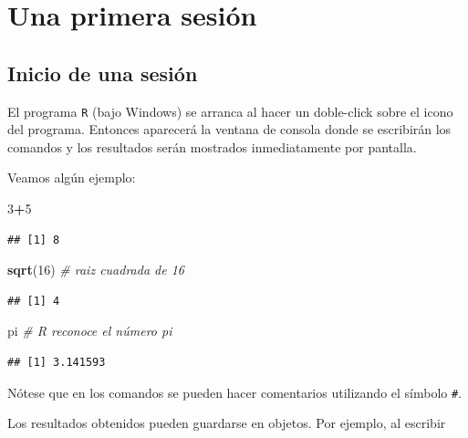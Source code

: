 \documentclass[]{book}
\newenvironment{Shaded}{\begin{snugshade}}{\end{snugshade}}
\newcommand{\KeywordTok}[1]{\textcolor[rgb]{0.13,0.29,0.53}{\textbf{#1}}}
\newcommand{\DecValTok}[1]{\textcolor[rgb]{0.00,0.00,0.81}{#1}}
\newcommand{\CommentTok}[1]{\textcolor[rgb]{0.56,0.35,0.01}{\textit{#1}}}
\newcommand{\OperatorTok}[1]{\textcolor[rgb]{0.81,0.36,0.00}{\textbf{#1}}}
\newcommand{\NormalTok}[1]{#1}
\begin{document}
\section{Una primera sesión}\label{una-primera-sesion}

\subsection{Inicio de una sesión}\label{inicio-de-una-sesion}

El programa \texttt{R} (bajo Windows) se arranca al hacer un doble-click
sobre el icono del programa. Entonces aparecerá la ventana de consola
donde se escribirán los comandos y los resultados serán mostrados
inmediatamente por pantalla.

Veamos algún ejemplo:

\begin{Shaded}
\begin{Highlighting}[]
\DecValTok{3}\OperatorTok{+}\DecValTok{5}
\end{Highlighting}
\end{Shaded}

\begin{verbatim}
## [1] 8
\end{verbatim}

\begin{Shaded}
\begin{Highlighting}[]
\KeywordTok{sqrt}\NormalTok{(}\DecValTok{16}\NormalTok{) }\CommentTok{# raiz cuadrada de 16}
\end{Highlighting}
\end{Shaded}

\begin{verbatim}
## [1] 4
\end{verbatim}

\begin{Shaded}
\begin{Highlighting}[]
\NormalTok{pi }\CommentTok{# R reconoce el número pi}
\end{Highlighting}
\end{Shaded}

\begin{verbatim}
## [1] 3.141593
\end{verbatim}

Nótese que en los comandos se pueden hacer comentarios utilizando el
símbolo \texttt{\#}.

Los resultados obtenidos pueden guardarse en objetos. Por ejemplo, al
escribir
\end{document}
